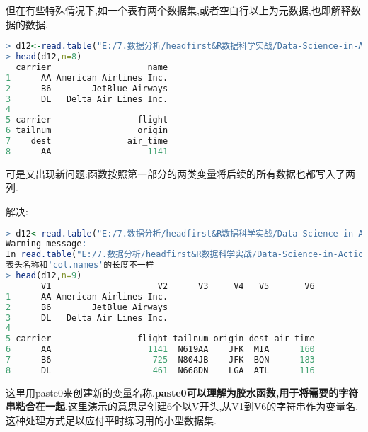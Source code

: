 \documentclass[11pt,a4paper,oneside]{book}
\begin{document}
但在有些特殊情况下,如一个表有两个数据集,或者空白行以上为元数据,也即解释数据的数据.
\begin{lstlisting}[language=r]
> d12<-read.table("E:/7.数据分析/headfirst&R数据科学实战/Data-Science-in-Action-R-Tools-and-Case-Studies-master/chapter1/RawData/airlines.csv",header=T,sep="\t",blank.lines.skip = FALSE,stringsAsFactors = FALSE)
> head(d12,n=8)
  carrier                   name
1      AA American Airlines Inc.
2      B6        JetBlue Airways
3      DL   Delta Air Lines Inc.
4                               
5 carrier                 flight
6 tailnum                 origin
7    dest               air_time
8      AA                   1141
\end{lstlisting}
可是又出现新问题:函数按照第一部分的两类变量将后续的所有数据也都写入了两列.

解决:

\begin{lstlisting}[language=r]
> d12<-read.table("E:/7.数据分析/headfirst&R数据科学实战/Data-Science-in-Action-R-Tools-and-Case-Studies-master/chapter1/RawData/airlines.csv",header=T,sep="\t",col.names=paste0("V",1:6),blank.lines.skip = FALSE,stringsAsFactors = FALSE)
Warning message:
In read.table("E:/7.数据分析/headfirst&R数据科学实战/Data-Science-in-Action-R-Tools-and-Case-Studies-master/chapter1/RawData/airlines.csv",  :
表头名称和'col.names'的长度不一样
> head(d12,n=9)
       V1                     V2      V3     V4   V5       V6
1      AA American Airlines Inc.                             
2      B6        JetBlue Airways                             
3      DL   Delta Air Lines Inc.                             
4                                                            
5 carrier                 flight tailnum origin dest air_time
6      AA                   1141  N619AA    JFK  MIA      160
7      B6                    725  N804JB    JFK  BQN      183
8      DL                    461  N668DN    LGA  ATL      116
\end{lstlisting}

这里用paste0来创建新的变量名称.\textbf{paste0可以理解为胶水函数,用于将需要的字符串粘合在一起}.这里演示的意思是创建6个以V开头,从V1到V6的字符串作为变量名.这种处理方式足以应付平时练习用的小型数据集.
\end{document}
